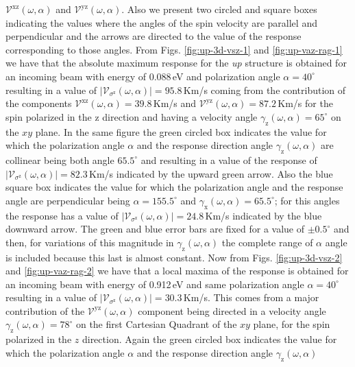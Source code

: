 \documentclass[prb,11pt,tightenlines,twocolumn,aps]{revtex4-1}
\begin{document}
$\mathcal{V}^{\mathrm{xz}}(\omega,\alpha)$ and
$\mathcal{V}^{\mathrm{yz}}(\omega,\alpha)$. Also we present two circled and
square boxes indicating the values where the angles of the spin velocity are
parallel and perpendicular and the arrows are directed to the value of the
response corresponding to those angles.
% 
From Figs. \ref{fig:up-3d-vsz-1} and \ref{fig:up-vaz-rag-1} we have that the
absolute maximum response for the \emph{up} structure is obtained for an
incoming beam with energy of 0.088\,eV and polarization angle
$\alpha=40^{\circ}$ resulting in a value of
$|\mathcal{V}_{\sigma^{\mathrm{z}}}(\omega,\alpha)|=95.8$\,Km/s coming from the
contribution of the components
$\mathcal{V}^{\mathrm{xz}}(\omega,\alpha)=39.8$\,Km/s and
$\mathcal{V}^{\mathrm{yz}}(\omega,\alpha)=87.2$\,Km/s for the spin polarized in
the $\mathrm{z}$ direction and having a velocity angle
$\gamma_{\mathrm{z}}(\omega,\alpha)=65^{\circ}$ on the $xy$ plane.
% 
In the same figure the green circled box indicates the value for which the
polarization angle $\alpha$ and the response direction angle
$\gamma_{\mathrm{z}}(\omega,\alpha)$ are collinear being both angle
$65.5^{\circ}$ and resulting in a value of the response of
$|\mathcal{V}_{\sigma^{\mathrm{z}}}(\omega,\alpha)|=82.3$\,Km/s indicated by the
upward green arrow.
% 
Also the blue square box indicates the value for which the polarization angle
and the response angle are perpendicular being $\alpha=155.5^{\circ}$ and
$\gamma_{\mathrm{x}}(\omega,\alpha)=65.5^{\circ}$; for this angles the response
has a value of $|\mathcal{V}_{\sigma^{\mathrm{z}}}(\omega,\alpha)|=24.8$\,Km/s
indicated by the blue downward arrow.
% 
The green and blue error bars are fixed for a value of $\pm0.5^{\circ}$ and
then, for variations of this magnitude in $\gamma_{\mathrm{z}}(\omega,\alpha)$
the complete range of $\alpha$ angle is included because this last is almost
constant.
% 
Now from Figs. \ref{fig:up-3d-vsz-2} and \ref{fig:up-vaz-rag-2} we have that a
local maxima of the response is obtained for an incoming beam with energy of
0.912\,eV and same polarization angle $\alpha=40^{\circ}$ resulting in a value
of $|\mathcal{V}_{\sigma^{\mathrm{z}}}(\omega,\alpha)|=30.3$\,Km/s. This comes
from a major contribution of the $\mathcal{V}^{\mathrm{yz}}(\omega,\alpha)$
component being directed in a velocity angle
$\gamma_{\mathrm{z}}(\omega,\alpha)=78^{\circ}$ on the first Cartesian Quadrant
of the $xy$ plane, for the spin polarized in the $z$ direction.
% 
Again the green circled box indicates the value for which the polarization angle
$\alpha$ and the response direction angle $\gamma_{\mathrm{z}}(\omega,\alpha)$
\end{document}
